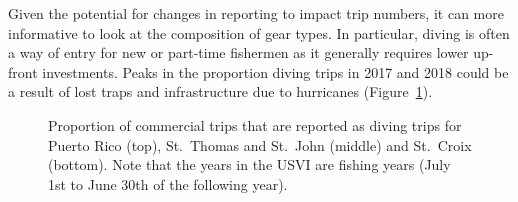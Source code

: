 \documentclass[
  letterpaper,
  oneside,
  open=any]{scrbook}
\begin{document}
Given the potential for changes in reporting to impact trip numbers, it
can more informative to look at the composition of gear types. In
particular, diving is often a way of entry for new or part-time
fishermen as it generally requires lower up-front investments. Peaks in
the proportion diving trips in 2017 and 2018 could be a result of lost
traps and infrastructure due to hurricanes (Figure~\ref{fig-dive}).

\begin{figure}


\caption{\label{fig-dive}Proportion of commercial trips that are
reported as diving trips for Puerto Rico (top), St.~Thomas and St.~John
(middle) and St.~Croix (bottom). Note that the years in the USVI are
fishing years (July 1st to June 30th of the following year).}

\end{figure}%
\end{document}
